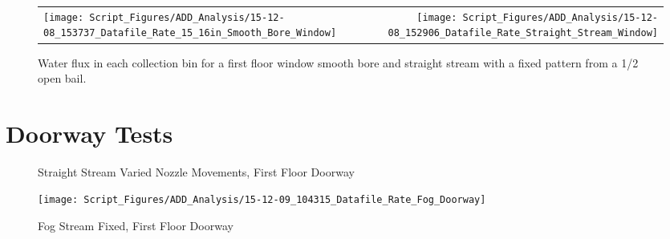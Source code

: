 \documentclass[12pt,oneside]{book}
\begin{document}
\begin{figure}[ht]
\begin{tabular*}{\textwidth}{lr}
\texttt{[image: Script\_Figures/ADD\_Analysis/15-12-08\_153737\_Datafile\_Rate\_15\_16in\_Smooth\_Bore\_Window]} & 
\texttt{[image: Script\_Figures/ADD\_Analysis/15-12-08\_152906\_Datafile\_Rate\_Straight\_Stream\_Window]} \\
\end{tabular*}
\caption{Water flux in each collection bin for a first floor window smooth bore and straight stream with a fixed pattern from a 1/2 open bail.}
\label{fig:SB_SS_Window_First_Floor_Half_Bail}
\end{figure}

\clearpage

\section{Doorway Tests}

\begin{figure}[ht]
\centering
{}
\caption{Straight Stream Varied Nozzle Movements, First Floor Doorway}
\label{fig:Straight Stream Varied Nozzle Movements, First Floor Doorway}
\end{figure}

\begin{figure}[ht]
\centering
\texttt{[image: Script\_Figures/ADD\_Analysis/15-12-09\_104315\_Datafile\_Rate\_Fog\_Doorway]} \\
\caption{Fog Stream Fixed, First Floor Doorway}
\label{fig:Fog Stream Fixed, First Floor Doorway}
\end{figure}
\end{document}
